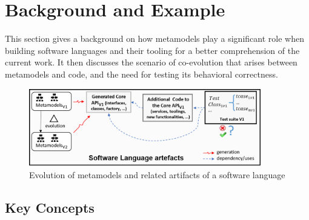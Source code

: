 \section{Background and Example}
\label{sec_background}




This section gives a background on how metamodels play a significant role when building software languages and their tooling for a better comprehension of the current work. It then discusses the scenario of co-evolution that arises between metamodels and code, and the need for testing its behavioral correctness. 

\begin{figure}[tb]
\centering
\includegraphics[width=0.9\textwidth]{./pics/chapter2pics/background.png}
\caption{Evolution of metamodels and related artifacts of a software language}
\label{fig:SL_useage}
\end{figure}


\subsection{Key Concepts}

